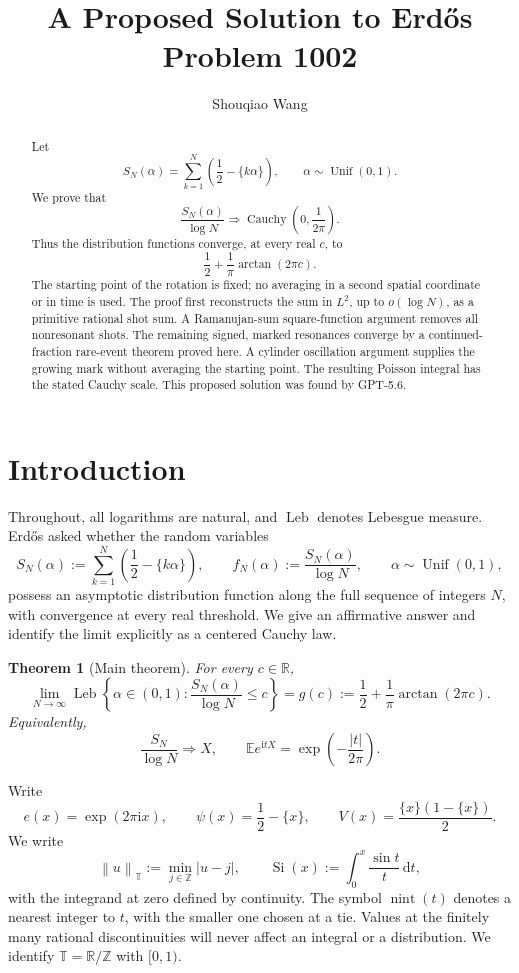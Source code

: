 \documentclass[11pt]{article}
\title{A Proposed Solution to Erd\H{o}s Problem 1002}
\author{Shouqiao Wang}
\affil{Columbia University\hspace{2.5em}Multiscalar Intelligence}
\date{}
\numberwithin{equation}{section}
\newtheorem{theorem}{Theorem}[section]
\theoremstyle{definition}
\newcommand{\T}{\mathbb T}
\newcommand{\R}{\mathbb R}
\newcommand{\Z}{\mathbb Z}
\newcommand{\E}{\mathbb E}
\newcommand{\1}{\mathbf 1}
\newcommand{\ii}{\mathrm i}
\newcommand{\dd}{\,\mathrm d}
\newcommand{\nint}{\operatorname{nint}}
\newcommand{\Si}{\operatorname{Si}}
\newcommand{\Leb}{\operatorname{Leb}}
\newcommand{\norm}[1]{\left\lVert#1\right\rVert}
\begin{document}
\maketitle

\begin{abstract}
Let
\[
 S_N(\alpha)=\sum_{k=1}^{N}\left(\frac12-\{k\alpha\}\right),
 \qquad \alpha\sim\operatorname{Unif}(0,1).
\]
We prove that
\[
 \frac{S_N(\alpha)}{\log N}\Longrightarrow
 \operatorname{Cauchy}\left(0,\frac1{2\pi}\right).
\]
Thus the distribution functions converge, at every real \(c\), to
\[
 \frac12+\frac1\pi\arctan(2\pi c).
\]
The starting point of the rotation is fixed; no averaging in a second
spatial coordinate or in time is used.  The proof first reconstructs the
sum in \(L^2\), up to \(o(\log N)\), as a primitive rational shot sum.
A Ramanujan-sum square-function argument removes all nonresonant shots.
The remaining signed, marked resonances converge by a continued-fraction
rare-event theorem proved here.  A cylinder oscillation argument supplies
the growing mark without averaging the starting point.  The resulting
Poisson integral has the stated Cauchy scale.
This proposed solution was found by GPT-5.6.
\end{abstract}

\section{Introduction}

Throughout, all logarithms are natural, and \(\Leb\) denotes Lebesgue
measure.  Erd\H{o}s asked \cite[p.~63]{Erdos1964} whether the random variables
\[
 S_N(\alpha):=\sum_{k=1}^{N}\left(\frac12-\{k\alpha\}\right),
 \qquad f_N(\alpha):=\frac{S_N(\alpha)}{\log N},
 \qquad \alpha\sim\operatorname{Unif}(0,1),
\]
possess an asymptotic distribution function along the full sequence of
integers \(N\), with convergence at every real threshold.  We give an
affirmative answer and identify the limit explicitly as a centered Cauchy
law.

\begin{theorem}[Main theorem]\label{thm:main}
For every \(c\in\R\),
\[
 \lim_{N\to\infty}
 \Leb\left\{\alpha\in(0,1):
 \frac{S_N(\alpha)}{\log N}\le c\right\}
 =
 g(c):=\frac12+\frac1\pi\arctan(2\pi c).
\]
Equivalently,
\[
 \frac{S_N}{\log N}\Longrightarrow X,\qquad
 \E e^{\ii tX}=\exp\left(-\frac{|t|}{2\pi}\right).
\]
\end{theorem}

Write
\[
 e(x)=\exp(2\pi\ii x),\qquad
 \psi(x)=\frac12-\{x\},\qquad
 V(x)=\frac{\{x\}(1-\{x\})}{2}.
\]
We write
\[
 \norm{u}_{\T}:=\min_{j\in\Z}|u-j|,\qquad
 \Si(x):=\int_0^x\frac{\sin t}{t}\dd t,
\]
with the integrand at zero defined by continuity.  The symbol
\(\nint(t)\) denotes a nearest integer to \(t\), with the smaller one
chosen at a tie.  Values at the finitely many rational discontinuities
will never affect an integral or a distribution.  We identify
\(\T=\R/\Z\) with \([0,1)\).
\end{document}
